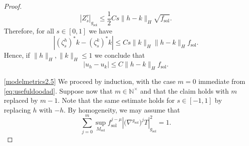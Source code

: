 \documentclass[10pt,a4paper]{amsart}
\newcommand{\N}{\mathbb{N}}
\providecommand{\sol}{\operatorname{sol}}
\begin{document}
\begin{proof}
\begin{equation*}
    |Z_s^\tau|_{g_{\sol}}\leq 
    \frac{1}{2}
    Cs\|h-k\|_H \sqrt{f_{\sol}}. 
\end{equation*}
Therefore, for all $s\in[0,1]$ we have
\begin{equation*}
     |(\zeta_s^h)^*k-(\zeta_s^k)^*k|\le Cs\|k\|_H\|h-k\|_H f_{\sol}.
\end{equation*}
Hence, if $\|h\|_H,\|k\|_H\le 1$ we conclude that
\begin{equation*}
    |u_h-u_k|\le C\|h-k\|_H f_{\sol}.
\end{equation*}

\ref{modelmetrics2.5} We proceed by induction, with the case $m=0$ immediate from \eqref{eq:usefuldoodad}. Suppose now that $m\in\N^\times$ and that the claim holds with
$m$ replaced by $m-1$. Note that the same estimate holds for $s\in [-1,1]$ by replacing $h$ with $-h$. By homogeneity, we may assume that
\begin{equation}\label{eq:normalized weighted tensor norm}
\sum_{j=0}^{m}
\sup_{M_{\sol}}
f_{\sol}^{j-\mu}
\left|
    \bigl(\nabla^{g_{\sol}}\bigr)^jT
\right|_{g_{\sol}}^2
=1.
\end{equation}


\end{proof}
\end{document}
